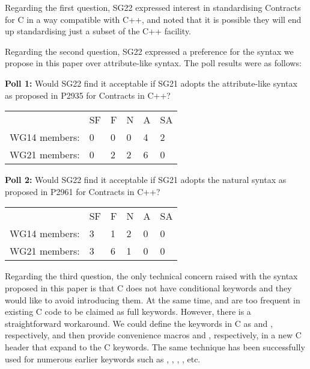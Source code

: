 Regarding the first question, SG22 expressed interest in standardising Contracts for C in a way compatible with C++, and noted that it is possible they will end up standardising just a subset of the C++ facility.

Regarding the second question, SG22 expressed a preference for the syntax we propose in this paper over attribute-like syntax. The poll results were as follows:

\begin{adjustwidth}{0.5cm}{0.5cm}
\textbf{Poll 1:} Would SG22 find it acceptable if SG21 adopts the attribute-like syntax as proposed in P2935 for Contracts in C++?

\begin{tabular}{l lllll}
 &SF & F & N & A & SA \\
WG14 members: & 0 & 0 & 0 & 4 & 2 \\
WG21 members: & 0 & 2 & 2 & 6 & 0
\end{tabular}
\end{adjustwidth}

\begin{adjustwidth}{0.5cm}{0.5cm}
\textbf{Poll 2:} Would SG22 find it acceptable if SG21 adopts the natural syntax as proposed in P2961 for Contracts in C++?

\begin{tabular}{l lllll}
 &SF & F & N & A & SA \\
WG14 members: & 3 & 1 & 2 & 0 & 0 \\
WG21 members: & 3 & 6 & 1 & 0 & 0
\end{tabular}
\end{adjustwidth}

Regarding the third question, the only technical concern raised with the syntax proposed in this paper is that C does not have conditional keywords and they would like to avoid introducing them. At the same time,  and  are too frequent in existing C code to be claimed as full keywords. However, there is a straightforward workaround. We could define the keywords in C as  and , respectively, and then provide convenience macros  and , respectively, in a new C header  that expand to the C keywords. The same technique has been successfully used for numerous earlier keywords such as , , , , etc.


